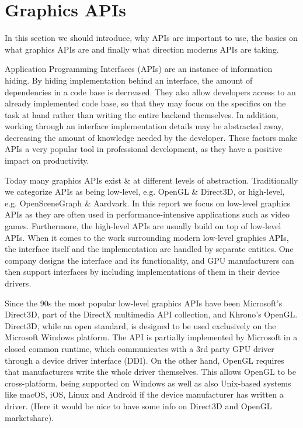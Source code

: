 \section{Graphics APIs}\label{sec:graphics_apis}
\begin{sectionmeta}
In this section we should introduce, why APIs are important to use, the basics on what graphics APIs are and finally what direction moderns APIs are taking.
\end{sectionmeta}

Application Programming Interfaces (APIs) are an instance of information hiding.
By hiding implementation behind an interface, the amount of dependencies in a code base is decreased.  
They also allow developers access to an already implemented code base, so that they may focus on the specifics on the task at hand rather than writing the entire backend themselves.
In addition, working through an interface implementation details may be abstracted away, decreasing the amount of knowledge needed by the developer.
These factors make APIs a very popular tool in professional development, as they have a positive impact on productivity. 

Today many graphics APIs exist \& at different levels of abstraction. 
Traditionally we categorize APIs as being low-level, e.g. OpenGL \& Direct3D, or high-level, e.g. OpenSceneGraph \& Aardvark.
In this report we focus on low-level graphics APIs as they are often used in performance-intensive applications such as video games.
Furthermore, the high-level APIs are usually build on top of low-level APIs.  
When it comes to the work surrounding modern low-level graphics APIs, the interface itself and the implementation are handled by separate entities. 
One company designs the interface and its functionality, and GPU manufacturers can then support interfaces by including implementations of them in their device drivers.

Since the 90s the most popular low-level graphics APIs have been Microsoft’s Direct3D, part of the DirectX multimedia API collection, and Khrono’s OpenGL. 
Direct3D, while an open standard, is designed to be used exclusively on the Microsoft Windows platform.
The API is partially implemented by Microsoft in a closed common runtime, which communicates with a 3rd party GPU driver through a device driver interface (DDI).
On the other hand, OpenGL requires that manufacturers write the whole driver themselves.
This allows OpenGL to be cross-platform, being supported on Windows as well as also Unix-based systems like macOS, iOS, Linux and Android if the device manufacturer has written a driver. 
(Here it would be nice to have some info on Direct3D and OpenGL marketshare).

